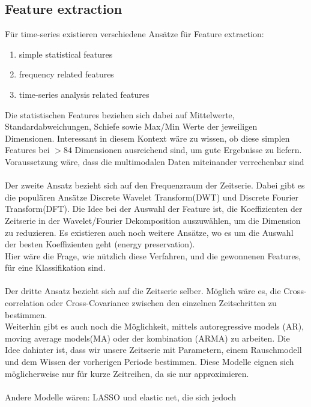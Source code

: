 \documentclass[]{report}
\begin{document}
\subsection*{Feature extraction}
Für time-series existieren verschiedene Ansätze für Feature extraction:
\begin{enumerate}
\item simple statistical features
\item frequency related features
\item time-series analysis related features
\end{enumerate}
Die statistischen Features beziehen sich dabei auf Mittelwerte, Standardabweichungen, Schiefe sowie Max/Min Werte der jeweiligen Dimensionen. Interessant in diesem Kontext wäre zu wissen, ob diese simplen Features bei $>84$ Dimensionen ausreichend sind, um gute Ergebnisse zu liefern. Voraussetzung wäre, dass die multimodalen Daten miteinander verrechenbar sind \\ \\
Der zweite Ansatz bezieht sich auf den Frequenzraum der Zeitserie. Dabei gibt es die populären Ansätze Discrete Wavelet Transform(DWT) und Discrete Fourier Transform(DFT). Die Idee bei der Auswahl der Feature ist, die Koeffizienten der Zeitserie in der Wavelet/Fourier Dekomposition auszuwählen, um die Dimension zu reduzieren. Es existieren auch noch weitere Ansätze, wo es um die Auswahl der besten Koeffizienten geht (energy preservation). \\
Hier wäre die Frage, wie nützlich diese Verfahren, und die gewonnenen Features, für eine Klassifikation sind.\\\\
Der dritte Ansatz bezieht sich auf die Zeitserie selber. Möglich wäre es, die Cross-correlation oder Cross-Covariance zwischen den einzelnen Zeitschritten zu bestimmen.\\
Weiterhin gibt es auch noch die Möglichkeit, mittels autoregressive models (AR), moving average models(MA) oder der kombination (ARMA) zu arbeiten. Die Idee dahinter ist, dass wir unsere Zeitserie mit Parametern, einem Rauschmodell und dem Wissen der vorherigen Periode bestimmen. Diese Modelle eignen sich möglicherweise nur für kurze Zeitreihen, da sie nur approximieren.\\\\
Andere Modelle wären: LASSO und elastic net, die sich jedoch
\end{document}
